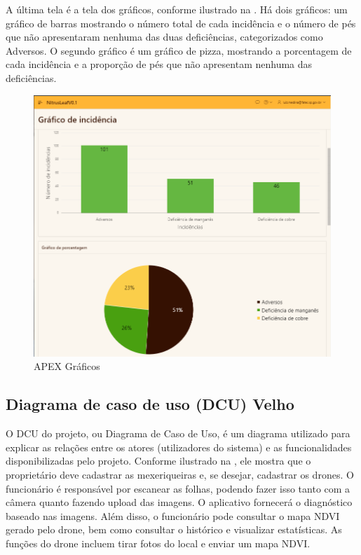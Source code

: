 \documentclass[
  a4paper,%
  12pt,%
  english,%
  brazilian,%
]{article}
\begin{document}
A última tela é a tela dos gráficos, conforme ilustrado na . Há dois gráficos: um gráfico de barras mostrando o número total de cada incidência e o número de pés que não apresentaram nenhuma das duas deficiências, categorizados como Adversos. O segundo gráfico é um gráfico de pizza, mostrando a porcentagem de cada incidência e a proporção de pés que não apresentam nenhuma das deficiências.

\begin{figure}[H]
\centering
\caption{APEX Gráficos}%
\label{fig:grafico}
\includegraphics[width=0.8\linewidth]{Logos/grafico.png}
\end{figure}

\subsection*{\textbf{Diagrama de caso de uso (DCU) Velho}}

O DCU do projeto, ou Diagrama de Caso de Uso, é um diagrama utilizado para explicar as relações entre os atores (utilizadores do sistema) e as funcionalidades disponibilizadas pelo projeto. Conforme ilustrado na , ele mostra que o proprietário deve cadastrar as mexeriqueiras e, se desejar, cadastrar os drones. O funcionário é responsável por escanear as folhas, podendo fazer isso tanto com a câmera quanto fazendo upload das imagens. O aplicativo fornecerá o diagnóstico baseado nas imagens. Além disso, o funcionário pode consultar o mapa NDVI gerado pelo drone, bem como consultar o histórico e visualizar estatísticas. As funções do drone incluem tirar fotos do local e enviar um mapa NDVI.
\end{document}
